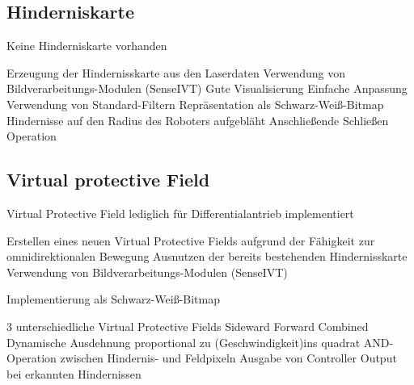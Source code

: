 \subsection{Hinderniskarte}
 
 Keine Hinderniskarte vorhanden

Erzeugung der Hindernisskarte aus den Laserdaten
Verwendung von Bildverarbeitungs-Modulen (SenseIVT)
            Gute Visualisierung
            Einfache Anpassung
            Verwendung von Standard-Filtern
         Repräsentation als Schwarz-Weiß-Bitmap
        Hindernisse auf den Radius des Roboters aufgebläht
        Anschließende Schließen Operation
\subsection{Virtual protective Field}
 
 Virtual Protective Field lediglich für Differentialantrieb implementiert
 
    Erstellen eines neuen Virtual Protective Fields aufgrund der Fähigkeit zur omnidirektionalen Bewegung
        Ausnutzen der bereits bestehenden Hindernisskarte
            Verwendung von Bildverarbeitungs-Modulen (SenseIVT)

Implementierung als Schwarz-Weiß-Bitmap

        3 unterschiedliche Virtual Protective Fields
            Sideward
            Forward
            Combined
        Dynamische Ausdehnung proportional zu (Geschwindigkeit)ins quadrat
        AND-Operation zwischen Hindernis- und Feldpixeln
        Ausgabe von Controller Output bei erkannten Hindernissen

